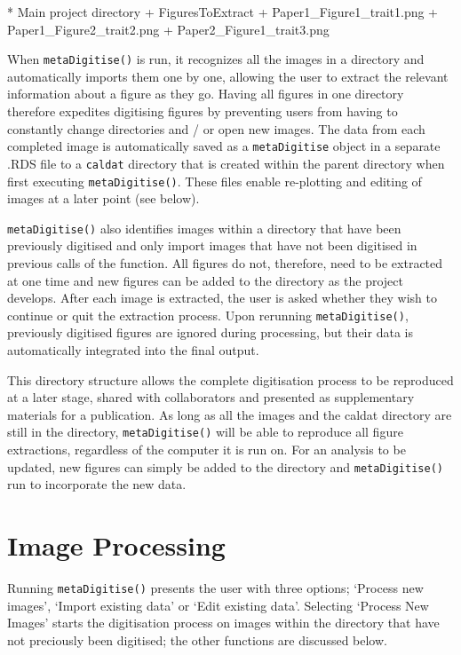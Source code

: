 \documentclass[12pt]{article}
\newcommand{\code}[1]{\texttt{#1}}
\newcommand{\fct}[1]{\texttt{#1()}}
\begin{document}
\begin{CodeChunk}
\begin{CodeOutput}
* Main project directory
    + FiguresToExtract
        + Paper1_Figure1_trait1.png
        + Paper1_Figure2_trait2.png
        + Paper2_Figure1_trait3.png
\end{CodeOutput}
\end{CodeChunk}

When \fct{metaDigitise} is run, it recognizes all the images in a directory and automatically imports them one by one, allowing the user to extract the relevant information about a figure as they go. Having all figures in one directory therefore expedites digitising figures by preventing users from having to constantly change directories and / or open new images. The data from each completed image is automatically saved as a \code{metaDigitise} object in a separate .RDS file to a \code{caldat} directory that is created within the parent directory when first executing \fct{metaDigitise}. These files enable re-plotting and editing of images at a later point (see below).

\fct{metaDigitise} also identifies images within a directory that have been previously digitised and only import images that have not been digitised in previous calls of the function. All figures do not, therefore, need to be extracted at one time and new figures can be added to the directory as the project develops. After each image is extracted, the user is asked whether they wish to continue or quit the extraction process. Upon rerunning \fct{metaDigitise}, previously digitised figures are ignored during processing, but their data is automatically integrated into the final output. 

This directory structure allows the complete digitisation process to be reproduced at a later stage, shared with collaborators and presented as supplementary materials for a publication. As long as all the images and the caldat directory are still in the directory, \fct{metaDigitise} will be able to reproduce all figure extractions, regardless of the computer it is run on. For an analysis to be updated, new figures can simply be added to the directory and \fct{metaDigitise} run to incorporate the new data. 



\section{Image Processing}
Running \fct{metaDigitise} presents the user with three options; `Process new images', `Import existing data' or `Edit existing data'. Selecting `Process New Images' starts the digitisation process on images within the directory that have not preciously been digitised; the other functions are discussed below.
\end{document}
